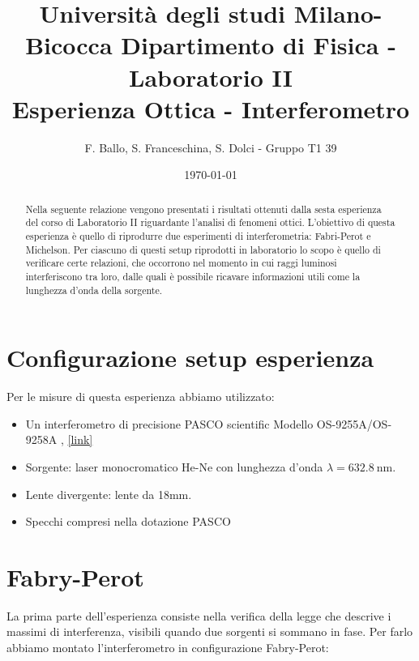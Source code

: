 \documentclass[letterpaper,12pt]{article}
\begin{document}
\title{{\small Università degli studi Milano-Bicocca  Dipartimento di Fisica - Laboratorio II }\\
	Esperienza Ottica - Interferometro}
\author{F. Ballo, S. Franceschina, S. Dolci - Gruppo T1 39}
\date{\today}
\maketitle
\thispagestyle{logoheader}


\begin{abstract}
	Nella seguente relazione vengono presentati i risultati ottenuti dalla sesta esperienza del corso di 
    Laboratorio II riguardante l'analisi di fenomeni ottici.
    L'obiettivo di questa esperienza è quello di riprodurre due esperimenti di interferometria: Fabri-Perot e Michelson.
    Per ciascuno di questi setup riprodotti in laboratorio lo scopo è quello di verificare certe relazioni, che occorrono
    nel momento in cui raggi luminosi interferiscono tra loro, dalle quali è possibile ricavare informazioni utili come 
    la lunghezza d'onda della sorgente.
	\begin{adjustwidth}{-1cm}{-1cm}
	\end{adjustwidth}
\end{abstract}
\tableofcontents
\newpage

\section{Configurazione setup esperienza}
Per le misure di questa esperienza abbiamo utilizzato:

\begin{itemize}
    \item Un interferometro di precisione PASCO scientific Modello OS-9255A/OS-9258A , \href{https://www.pasco.com/products/lab-apparatus/light-and-optics/advanced-optics/os-9255}{[link]}
    \item Sorgente: laser monocromatico He-Ne con lunghezza d'onda $\lambda = \SI{632.8}{\nano\meter}$.
    \item Lente divergente: lente da 18mm.
    \item Specchi compresi nella dotazione PASCO
\end{itemize}


\section{Fabry-Perot}
La prima parte dell'esperienza consiste nella verifica della legge che descrive
i massimi di interferenza, visibili quando due sorgenti si sommano in fase. 
Per farlo abbiamo montato l'interferometro in configurazione Fabry-Perot:
\end{document}
